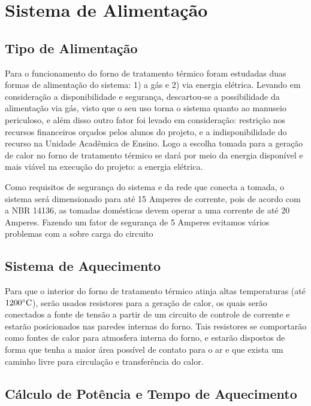 \section{Sistema de Alimentação}

\subsection{Tipo de Alimentação}

Para o funcionamento do forno de tratamento térmico foram estudadas duas formas de alimentação do sistema: 1) a gás e 2) via energia elétrica. Levando em consideração a disponibilidade e segurança, descartou-se a possibilidade da alimentação via gás, visto que o seu uso torna o sistema quanto ao manuseio periculoso, e além disso outro fator foi levado em consideração: restrição nos recursos financeiros orçados pelos alunos do projeto, e a indisponibilidade do recurso na Unidade Acadêmica de Ensino. Logo a escolha tomada para a geração de calor no forno de tratamento térmico se dará por meio da energia disponível e mais viável na execução do projeto: a energia elétrica.

Como requisitos de segurança do sistema e da rede que conecta a tomada, o sistema será dimensionado para até 15 Amperes de corrente, pois de acordo com a NBR 14136, as tomadas domésticas devem operar a uma corrente de até 20 Amperes. Fazendo um fator de segurança de 5 Amperes evitamos vários problemas com a sobre carga do circuito

\subsection{Sistema de Aquecimento}

Para que o interior do forno de tratamento térmico atinja altas temperaturas (até $1200 \degree \text{C}$), serão usados resistores para a geração de calor, os quais serão conectados a fonte de tensão a partir de um circuito de controle de corrente e estarão posicionados nas paredes internas do forno. Tais resistores se comportarão como fontes de calor para atmosfera interna do forno, e estarão dispostos de forma que tenha a maior área possível de contato para o ar e que exista um caminho livre para circulação e transferência do calor.

\subsection{Cálculo de Potência e Tempo de Aquecimento}

